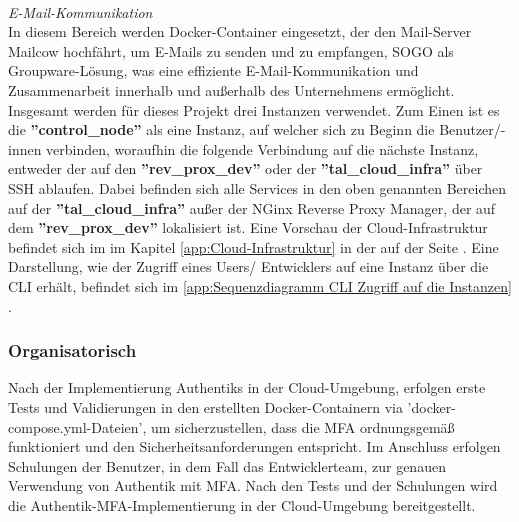 \\\textit{E-Mail-Kommunikation}
\\In diesem Bereich werden Docker-Container eingesetzt, der den Mail-Server Mailcow hochfährt, um E-Mails zu senden und 
zu empfangen, SOGO als Groupware-Lösung, was eine effiziente E-Mail-Kommunikation und Zusammenarbeit innerhalb und außerhalb des 
Unternehmens ermöglicht.
Insgesamt werden für dieses Projekt drei Instanzen verwendet. Zum Einen ist es die \textbf{''control\_node''} 
als eine Instanz, auf welcher sich zu Beginn die Benutzer/-innen verbinden, woraufhin die folgende Verbindung auf die nächste Instanz, 
entweder der auf den \textbf{''rev\_prox\_dev''} oder der \textbf{''tal\_cloud\_infra''} über SSH ablaufen. Dabei befinden 
sich alle Services in den oben genannten Bereichen auf der \textbf{''tal\_cloud\_infra''} außer 
der NGinx Reverse Proxy Manager, der auf dem \textbf{''rev\_prox\_dev''} lokalisiert ist. Eine Vorschau der Cloud-Infrastruktur befindet 
sich im  im Kapitel \ref{app:Cloud-Infrastruktur} in der  auf der Seite 
\pageref{app:Cloud-Infrastruktur}. Eine Darstellung, wie der Zugriff eines Users/ Entwicklers auf eine Instanz über die \acs*{CLI} erhält, 
befindet sich im  \ref*{app:Sequenzdiagramm CLI Zugriff auf die Instanzen} .

\subsubsection{Organisatorisch}
\label{sec:Organisatorisch}
Nach der Implementierung Authentiks in der Cloud-Umgebung, erfolgen erste Tests und Validierungen in den erstellten 
Docker-Containern via 'docker-compose.yml-Dateien', um sicherzustellen, dass die \acs*{MFA} ordnungsgemäß funktioniert und den 
Sicherheitsanforderungen entspricht. 
Im Anschluss erfolgen Schulungen der Benutzer, in dem Fall das Entwicklerteam, zur genauen Verwendung von Authentik mit MFA. 
Nach den Tests und der Schulungen wird die Authentik-\acs*{MFA}-Implementierung in der Cloud-Umgebung bereitgestellt.

